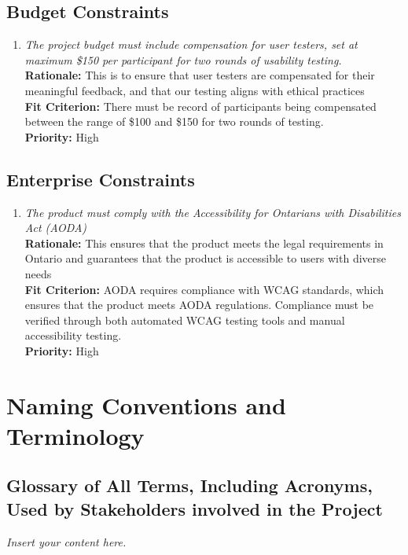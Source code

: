 \documentclass[12pt]{article}
\newcommand{\lips}{\textit{Insert your content here.}}
\begin{document}
\subsection{Budget Constraints}
\begin{enumerate}[label=MD-BC \arabic*., wide=0pt, leftmargin=*]
  \item \emph{The project budget must include compensation for user testers, set at maximum \$150 per participant for two rounds of usability testing.}\\[2mm]
    {\bf Rationale:} This is to ensure that user testers are compensated for their meaningful feedback, 
    and that our testing aligns with ethical practices\\
    {\bf Fit Criterion:} There must be record of participants being compensated between the range of \$100 and \$150 for
    two rounds of testing. \\
    {\bf Priority:} High
\end{enumerate}
\subsection{Enterprise Constraints}
\begin{enumerate}[label=MD-EC \arabic*., wide=0pt, leftmargin=*]
  \item \emph{The product must comply with the Accessibility for Ontarians with Disabilities Act (AODA)}\\[2mm]
    {\bf Rationale:} This ensures that the product meets the legal requirements in Ontario and guarantees that 
    the product is accessible to users with diverse needs\\
    {\bf Fit Criterion:} AODA requires compliance with WCAG standards, which ensures that the product meets AODA regulations. 
    Compliance must be verified through both automated WCAG testing tools and manual accessibility testing.\\
    {\bf Priority:} High
\end{enumerate}

\section{Naming Conventions and Terminology}
\subsection{Glossary of All Terms, Including Acronyms, Used by Stakeholders
involved in the Project}
\lips
\end{document}
